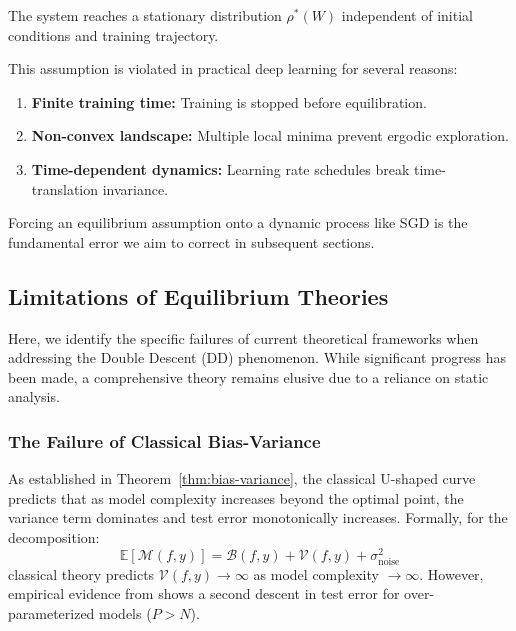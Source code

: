 \begin{assumption}
The system reaches a stationary distribution $\rho^*(W)$ independent of initial conditions and training trajectory.
\end{assumption}

This assumption is violated in practical deep learning for several reasons:
\begin{enumerate}[topsep=1pt,itemsep=1pt]
    \item \textbf{Finite training time:} Training is stopped before equilibration.
    \item \textbf{Non-convex landscape:} Multiple local minima prevent ergodic exploration.
    \item \textbf{Time-dependent dynamics:} Learning rate schedules break time-translation invariance.
\end{enumerate}

Forcing an equilibrium assumption onto a dynamic process like SGD is the fundamental error we aim to correct in subsequent sections.

\subsection{Limitations of Equilibrium Theories}

Here, we identify the specific failures of current theoretical frameworks when addressing the Double Descent (DD) phenomenon. While significant progress has been made, a comprehensive theory remains elusive due to a reliance on static analysis.

\subsubsection{The Failure of Classical Bias-Variance}

As established in Theorem~\ref{thm:bias-variance}, the classical U-shaped curve predicts that as model complexity increases beyond the optimal point, the variance term dominates and test error monotonically increases. Formally, for the decomposition:
\begin{equation}
    \mathbb{E}[\mathcal{M}(f,y)] = \mathcal{B}(f,y) + \mathcal{V}(f,y) + \sigma^2_{\text{noise}}
\end{equation}
classical theory predicts $\mathcal{V}(f,y) \to \infty$ as model complexity $\to \infty$. However, empirical evidence from \cite{belkin_reconciling_2019,nakkiran_deep_2019} shows a second descent in test error for over-parameterized models ($P > N$).


